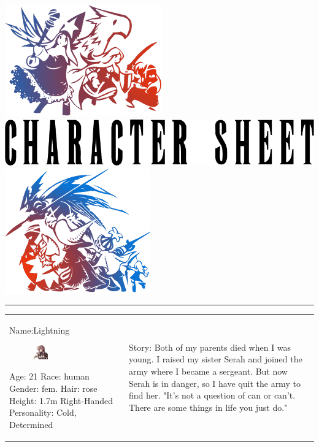 \clearpage
\thispagestyle{empty}
{
	\noindent \includegraphics[width=0.18\columnwidth]{./art/images/tleft.png} 
	\hspace{0.8cm}
	\includegraphics[width=0.55\columnwidth]{./art/images/cs.png}
	\hfill
	\includegraphics[width=0.15\columnwidth]{./art/images/tright.png} \\
}
\vspace{-0.5cm}
\hrule
\begin{tabularx}{\columnwidth}{XX@{\hspace{0.3cm}}}
	\noindent \newline
	\hypertarget{csex}{Name}:\hspace{0.5cm}Lightning 
	\begin{figure} 
	\includegraphics[width=0.23\textwidth]{./art/images/claire.png}
	\end{figure} \newline 
	Age: 21 \newline
	Race: human \newline
	Gender: fem. \newline
	Hair: rose \newline
	Height: 1.7m \newline
	Right-Handed \newline \newline \newline
	Personality: Cold, Determined \newline  
	&  
	\noindent \newline
	Story:
	\newline  \newline 
	Both of my parents died when I was young. 
	I raised my sister Serah and joined the army where I became a sergeant.
	But now Serah is in danger, so I have quit the army to find her. 
	\newline \newline \newline
	"It's not a question of can or can't. There are some things in life you just do."
	\newline
\end{tabularx}
